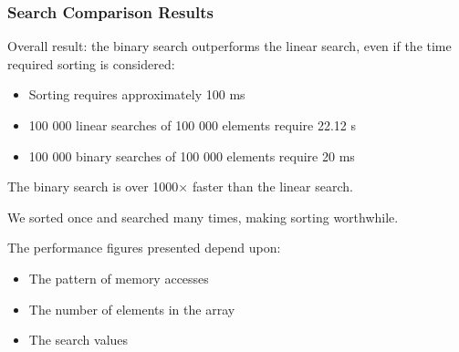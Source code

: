 \begin{frame}
\frametitle{Search Comparison Results}

Overall result: the binary search outperforms the linear search, even if the time required sorting is considered:
\begin{itemize}
	\item Sorting requires approximately 100 ms
	\item 100 000 linear searches of 100 000 elements require 22.12 s
	\item 100 000 binary searches of 100 000 elements require 20 ms
\end{itemize}

The binary search is over 1000$\times$ faster than the linear search.

We sorted once and searched many times, making sorting worthwhile.

The performance figures presented depend upon:
\begin{itemize}
	\item The pattern of memory accesses
	\item The number of elements in the array
	\item The search values
\end{itemize}
\end{frame}




